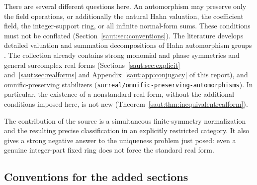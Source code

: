 \documentclass[11pt]{article}
\theoremstyle{definition}
\theoremstyle{remark}
\newcommand{\repo}[1]{\nolinkurl{#1}}%
\numberwithin{equation}{section}
\begin{document}
There are several different questions here. An automorphism may preserve only
the field operations, or additionally the natural Hahn valuation, the
coefficient field, the integer-support ring, or all infinite normal-form sums.
These conditions must not be conflated (Section~\ref{saut:sec:conventions}).
The literature develops detailed valuation and summation decompositions of Hahn
automorphism groups \cite{KS,KKS}. The collection already contains strong
monomial and phase symmetries and general surcomplex real forms
(Sections~\ref{saut:sec:explicit} and~\ref{saut:sec:realforms} and
Appendix~\ref{saut:app:conjugacy} of this report), and omnific-preserving
stabilizers (\repo{surreal/omnific-preserving-automorphisms}). In particular,
the existence of a nonstandard real form, without the additional conditions
imposed here, is not new (Theorem~\ref{saut:thm:inequivalentrealform}).

The contribution of the source is a simultaneous finite-symmetry normalization
and the resulting precise classification in an explicitly restricted category.
It also gives a strong negative answer to the uniqueness problem just posed:
even a genuine integer-part fixed ring does not force the standard real form.

\subsection{Conventions for the added sections}\label{saut:fs:sec:conventions}
\end{document}
